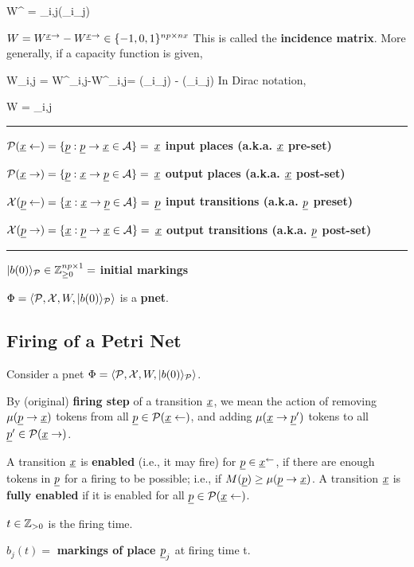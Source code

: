 \beq
W^{\rvx \rarrow} = \sum_{i,j}\kappa(\rvp_i\larrow \rvx_j)
\eeq

$W =W^{\rvx \rarrow}-W^{\rvx \rarrow}\in \{-1, 0, 1\}^{np\times nx}$ This is called the {\bf incidence matrix}.
More generally, if a capacity function is given, 

\beq
W_{i,j} =
 W^{\rvx \rarrow}_{i,j}-W^{\rvx \larrow}_{i,j}=
\kappa(\rvp_i\larrow \rvx_j)
-
\kappa(\rvp_i\rarrow \rvx_j)
\eeq
In Dirac notation, 

\beq
W =  \sum_{i,j}
\eeq

\hrule
$\calp(\rvx\larrow) = \{\rvp : \rvp \rarrow \rvx\in\cala\}=$ {\bf $\rvx$ input places (a.k.a. $\rvx$ pre-set)}

$\calp(\rvx\rarrow) = \{\rvp : \rvx \rarrow \rvp \in \cala\}=$ {\bf $\rvx$ output places (a.k.a. $\rvx$ post-set)}

$\calx(\rvp\larrow) = \{\rvx : \rvx \rarrow \rvp \in \cala \}=$ {\bf$\rvp$ input transitions (a.k.a. $\rvp$ preset)}

$\calx(\rvp\rarrow) = \{\rvx : \rvp \rarrow\rvx \in\cala\}=$ {\bf $\rvx$ output transitions (a.k.a. $\rvp$ post-set)}

\hrule
$|b(0)\rangle_{\cal P}\in {\mathbb{Z}}_{\geq 0}^{np\times 1} =$ {\bf initial markings}

$\Phi = \left\langle{\cal P}, {\cal X}, W,|b(0)\rangle_{\cal P}\right\rangle$ is a {\bf pnet}.
\subsection{Firing of a Petri Net}
Consider a pnet $\Phi = \left\langle{\cal P}, {\cal X}, W,|b(0)\rangle_{\cal P}\right\rangle$.

By (original) {\bf firing step} of a transition $\rvx$, we mean the action of removing $\mu(\rvp\rarrow \rvx)$
tokens from all $\rvp\in\calp(\rvx\larrow)$, and adding $\mu(\rvx\rarrow\rvp')$ tokens to all $\rvp'\in\calp(\rvx\rarrow)$.

A transition $\rvx$ is {\bf enabled} 
(i.e., it may fire)
for $\rvp\in \rvx^{\larrow}$, if there are enough tokens in 
$\rvp$ for a firing to be possible; i.e., if $M(\rvp) \geq \mu(\rvp\rarrow \rvx)$. A transition $\rvx$ is {\bf fully enabled} if it is enabled for all $\rvp\in \calp(\rvx\larrow)$.

$t \in {\mathbb{Z}}_{>0}$ is the firing time.

$b_j(t) =$ {\bf markings of place $\rvp_j$} at firing time t.

